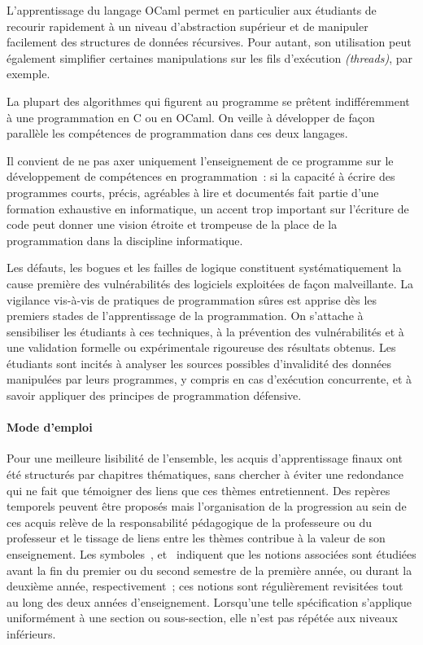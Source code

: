 L'apprentissage du langage OCaml permet en particulier aux étudiants de recourir rapidement à un niveau d'abstraction supérieur et de manipuler facilement des structures de données récursives. Pour autant, son utilisation peut également simplifier certaines manipulations sur les fils d'exécution \textit{(threads)}, par exemple.

La plupart des algorithmes qui figurent au programme se prêtent indifféremment à une programmation en C ou en OCaml. On veille à développer de façon parallèle les compétences de programmation dans ces deux langages. 

Il convient de ne pas axer uniquement l'enseignement de ce programme sur le développement de compétences en programmation~: si la capacité à écrire des programmes courts, précis, agréables à lire et documentés fait partie d'une formation exhaustive en informatique, un accent trop important sur l'écriture de code peut donner une vision étroite et trompeuse de la place de la programmation dans la discipline informatique.

Les défauts, les bogues et les failles de logique constituent systématiquement la cause première des vulnérabilités des logiciels exploitées de façon malveillante. La vigilance vis-à-vis de pratiques de programmation sûres est apprise dès les premiers stades de l'apprentissage de la programmation. On s'attache à sensibiliser les étudiants à ces techniques, à la prévention des vulnérabilités et à une validation formelle ou expérimentale rigoureuse des résultats obtenus. Les étudiants sont incités à analyser les sources possibles d'invalidité des données manipulées par leurs programmes, y compris en cas d'exécution concurrente, et à savoir appliquer des principes de programmation défensive.

\paragraph{Mode d'emploi} Pour une meilleure lisibilité de l'ensemble, les acquis d'apprentissage finaux ont été structurés par chapitres thématiques, sans chercher à éviter une redondance qui ne fait que témoigner des liens que ces thèmes entretiennent. Des repères temporels peuvent être proposés mais l'organisation de la progression au sein de ces acquis relève de la responsabilité pédagogique de la professeure ou du professeur et le tissage de liens entre les thèmes contribue à la valeur de son enseignement. Les symboles~\semUn{}, \semDeux{} et~\semTroisQuatre{} indiquent que les notions associées sont étudiées avant la fin du premier ou du second semestre de la première année, ou durant la deuxième année, respectivement~; ces notions sont régulièrement revisitées tout au long des deux années d'enseignement. Lorsqu'une telle spécification s'applique uniformément à une section ou sous-section, elle n'est pas répétée aux niveaux inférieurs.
